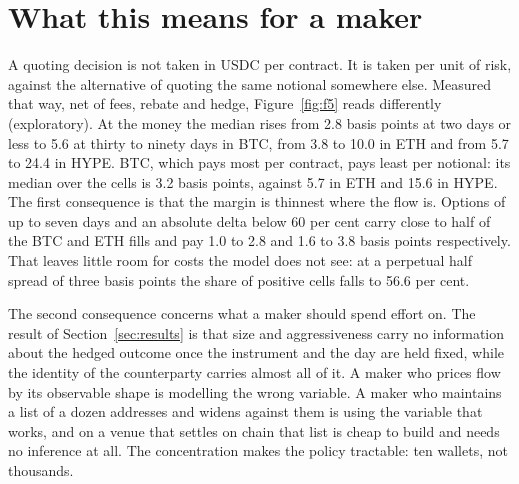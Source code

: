 \documentclass[a4paper,fleqn]{cas-dc}
\begin{document}
\section{What this means for a maker}\label{sec:maker}
A quoting decision is not taken in USDC per contract. It is taken per unit of risk, against the alternative
of quoting the same notional somewhere else. Measured that way, net of fees, rebate and hedge, Figure~\ref{fig:f5}
reads differently (exploratory). At the money the median rises from 2.8 basis points at two days or less to 5.6 at thirty
to ninety days in BTC, from 3.8 to 10.0 in ETH and from 5.7 to 24.4 in HYPE. BTC, which pays most per contract, pays least per notional: its median over the cells is 3.2
basis points, against 5.7 in ETH and 15.6 in HYPE. The first consequence is that the margin is thinnest
where the flow is. Options of up to seven days and an absolute delta below 60 per cent carry close to half
of the BTC and ETH fills and pay 1.0 to 2.8 and 1.6 to 3.8 basis points respectively. That leaves little
room for costs the model does not see: at a perpetual half spread of three basis points the share of
positive cells falls to 56.6 per cent.

The second consequence concerns what a maker should spend effort on. The result of Section~\ref{sec:results}
is that size and aggressiveness carry no information about the hedged outcome once the instrument and the day are
held fixed, while the identity of the counterparty carries almost all of it. A maker who prices flow by its
observable shape is modelling the wrong variable. A maker who maintains a list of a dozen addresses and
widens against them is using the variable that works, and on a venue that settles on chain that list is
cheap to build and needs no inference at all. The concentration makes the policy tractable: ten wallets, not
thousands.
\end{document}
